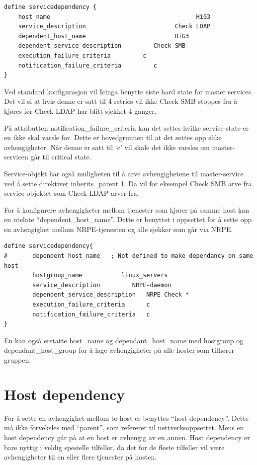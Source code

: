 \begin{lstlisting}
define servicedependency {
	host_name                                         HiG3
	service_description                         Check LDAP
	dependent_host_name                         HiG3
	dependent_service_description         Check SMB
	execution_failure_criteria         c
	notification_failure_criteria         c
}
\end{lstlisting}

Ved standard konfigurasjon vil Icinga benytte siste hard state for master services. Det vil si at hvis denne er satt til 4 retries vil ikke Check SMB stoppes fra å kjøres før Check LDAP har blitt sjekket 4 ganger. 

På attributten notification\_failure\_criteria kan det settes hvilke service-state-er en ikke skal varsle for. Dette er hovedgrunnen til at det settes opp slike avhengigheter. Når denne er satt til ‘c’ vil skale det ikke varsles om master-servicen går til critical state.

Service-objekt har også muligheten til å arve avhengighetene til master-service ved å sette direktivet inherits\_parent 1. Da vil for eksempel Check SMB arve fra service-objektet som Check LDAP arver fra.

For å konfigurere avhengigheter mellom tjenester som kjører på samme host kan en utelate “dependent\_host\_name”. Dette er benyttet i oppsettet for å sette opp en avhengighet mellom NRPE-tjenesten og alle sjekker som går via NRPE.

\begin{lstlisting}
define servicedependency{
#       dependent_host_name   ; Not defined to make dependancy on same host            
        hostgroup_name           linux_servers
        service_description         NRPE-daemon
        dependent_service_description   NRPE Check *
        execution_failure_criteria      c
        notification_failure_criteria   c
}
\end{lstlisting}

En kan også erstatte host\_name og dependant\_host\_name med hostgroup og dependant\_host\_group for å lage avhengigheter på alle hoster som tilhører gruppen.

\section{Host dependency}

For å sette en avhengighet mellom to host-er benyttes “host dependency”. Dette må ikke forveksles med “parent”, som refererer til nettverksoppsettet. Mens en host dependency går på at en host er avhengig av en annen. Host dependency er bare nyttig i veldig spesielle tilfeller, da det for de fleste tilfeller vil være avhengigheter til en eller flere tjenester på hosten. 


